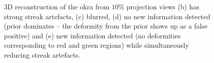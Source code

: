 \documentclass{article}
\begin{document}
\begin{figure}[!h]
\hfill
{}
\caption[3D reconstruction of okra dataset]{3D reconstruction of the okra from $10\%$ projection
  views (b) has strong streak artefacts, (c) blurred, (d) no new
  information detected (prior dominates -- the deformity from the prior
  shows up as a false positive) and (e) new information detected (no deformities
  corresponding to red and green regions) while simultaneously
  reducing streak artefacts.}
\label{fig:okra_3D_results}
\end{figure}

\end{document}
